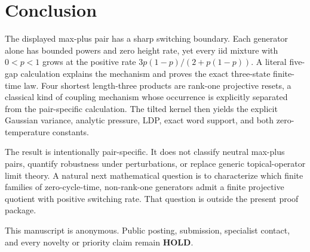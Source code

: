 \section{Conclusion}
\label{sec:conclusion}

The displayed max-plus pair has a sharp switching boundary.  Each generator
alone has bounded powers and zero height rate, yet every iid mixture with
$0<p<1$ grows at the positive rate $3p(1-p)/(2+p(1-p))$.  A literal
five-gap calculation explains the mechanism and proves the exact
three-state finite-time law.  Four shortest length-three products are
rank-one projective resets, a classical kind of coupling mechanism whose
occurrence is explicitly separated from the pair-specific calculation.
The tilted kernel then yields the explicit Gaussian variance, analytic
pressure, LDP, exact word support, and both zero-temperature constants.

The result is intentionally pair-specific.  It does not classify neutral
max-plus pairs, quantify robustness under perturbations, or replace generic
topical-operator limit theory.  A natural next mathematical question is to
characterize which finite families of zero-cycle-time, non-rank-one
generators admit a finite projective quotient with positive switching rate.
That question is outside the present proof package.

This manuscript is anonymous.  Public posting, submission, specialist
contact, and every novelty or priority claim remain \textbf{HOLD}.
